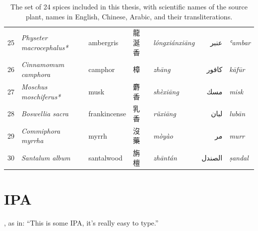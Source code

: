 \begin{table}[ht]
\begin{tabularx}{\textwidth}{@{}r>{\footnotesize}llll@{}rl@{}}
\midrule
 & & & & & & \\ \midrule
25          & \textit{Physeter macrocephalus*} & ambergris        & 龍涎香              & \textit{lóngxiánxiāng}   & عنبر            & \textit{ʿambar}          \\
26          & \textit{Cinnamomum camphora}     & camphor          & 樟                & \textit{zhāng}           & كافور           & \textit{kāfūr}           \\
27          & \textit{Moschus moschiferus*}    & musk             & 麝香               & \textit{shèxiāng}        & مسك             & \textit{misk}            \\
28          & \textit{Boswellia sacra}         & frankincense     & 乳香               & \textit{rǔxiāng}         & لبان            & \textit{lubān}           \\
29          & \textit{Commiphora myrrha}       & myrrh            & 沒藥               & \textit{mòyào}           & مر              & \textit{murr}            \\
30          & \textit{Santalum album}          & santalwood       & 旃檀               & \textit{zhāntán}         & الصندل          & \textit{ṣandal}          \\ 
\bottomrule
\end{tabularx}
\caption[An elaborate table]{The set of 24 spices included in this thesis, with scientific names of the source plant, names in English, Chinese, Arabic, and their transliterations.}
\label{table:set}
\end{table}

\setlength{\tabcolsep}{6pt} %

\blindtext

\section{IPA}

\textipa{[ðIsIzsAmaIpeI]},  as in: ``This is some IPA, it's really easy to type.''

